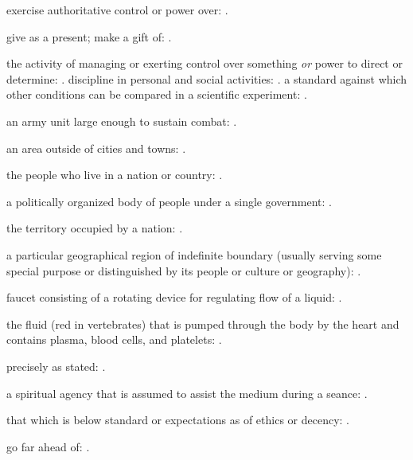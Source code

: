   exercise authoritative control or power over:   .

  give as a present; make a gift of:   .

  the activity of managing or exerting control over something \textit{or} power to direct or determine: . discipline in personal and social activities:   . a standard against which other conditions can be compared in a scientific experiment:   .

  an army unit large enough to sustain combat: .

  an area outside of cities and towns:   .

  the people who live in a nation or country:   .

  a politically organized body of people under a single government:   .

  the territory occupied by a nation:   .

  a particular geographical region of indefinite boundary (usually serving some special purpose or distinguished by its people or culture or geography):   .

  faucet consisting of a rotating device for regulating flow of a liquid:   .

  the fluid (red in vertebrates) that is pumped through the body by the heart and contains plasma, blood cells, and platelets: .

  precisely as stated: .

  a spiritual agency that is assumed to assist the medium during a seance: .

  that which is below standard or expectations as of ethics or decency:   .

  go far ahead of:   .

